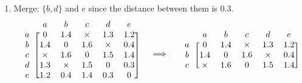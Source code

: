 \documentclass[10pt]{report}
\begin{document}
{\begin{enumerate}
\begin{align*}
\begin{blockarray}{cccccc}
\begin{block}{c[ccccc]}
            e & 1.2 & 0.4 & 1.4 & 0.3 & 0 \\
          \end{block}
        \end{blockarray}
        \quad
        \implies
        \quad
        \begin{blockarray}{cccccc}
          & a & b & c & d & e \\
          \begin{block}{c[ccccc]}
            a & 0 & 1.4 & \boxed{0.2} & 1.3 & 1.2 \\
            b & 1.4 & 0 & 1.6 & \times & 0.4 \\
            c & \boxed{0.2} & 1.6 & 0 & 1.5 & 1.4 \\
            d & 1.3 & \times & 1.5 & 0 & 0.3 \\
            e & 1.2 & 0.4 & 1.4 & 0.3 & 0 \\
          \end{block}
        \end{blockarray}
      \end{align*}
    \item Merge: $\{b,d\}$ and $e$ since the distance between them is $0.3$.
      \begin{align*}
        \begin{blockarray}{cccccc}
          & a & b & c & d & e \\
          \begin{block}{c[ccccc]}
            a & 0 & 1.4 & \times & 1.3 & 1.2 \\
            b & 1.4 & 0 & 1.6 & \times & 0.4 \\
            c & \times & 1.6 & 0 & 1.5 & 1.4 \\
            d & 1.3 & \times & 1.5 & 0 & 0.3 \\
            e & 1.2 & 0.4 & 1.4 & 0.3 & 0 \\
          \end{block}
        \end{blockarray}
        \quad
        \implies
        \quad
        \begin{blockarray}{cccccc}
          & a & b & c & d & e \\
          \begin{block}{c[ccccc]}
            a & 0 & 1.4 & \times & 1.3 & 1.2 \\
            b & 1.4 & 0 & 1.6 & \times & 0.4 \\
            c & \times & 1.6 & 0 & 1.5 & 1.4 \\

\end{block}
\end{blockarray}
\end{align*}
\end{enumerate}}
\end{document}
